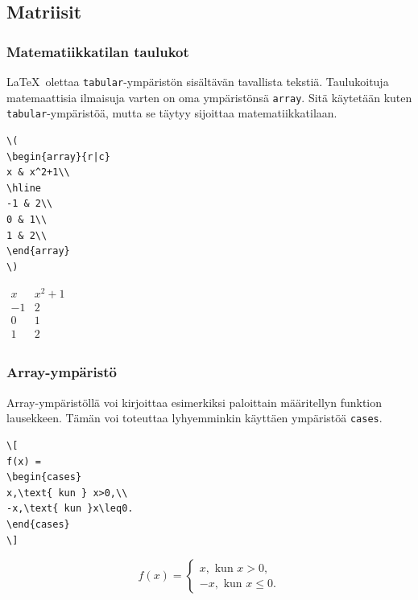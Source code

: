 \documentclass[handout]{beamer}
\theoremstyle{remark}
\newcommand{\vaihto}{\\ \vspace{10pt}}
\begin{document}
\subsection{Matriisit}
\begin{frame}[fragile]
\frametitle{Matematiikkatilan taulukot}
\LaTeX\ olettaa \verb-tabular--ympäristön sisältävän tavallista tekstiä. Taulukoituja matemaattisia ilmaisuja varten on oma ympäristönsä \verb-array-. Sitä käytetään kuten \verb-tabular--ympäristöä, mutta se täytyy sijoittaa matematiikkatilaan.\vaihto

\begin{minipage}{5cm}
\begin{scriptsize}
\begin{Verbatim}[frame=single]
\(
\begin{array}{r|c}
x & x^2+1\\
\hline
-1 & 2\\
0 & 1\\
1 & 2\\
\end{array}
\)
\end{Verbatim}
\end{scriptsize}
\end{minipage}
\begin{minipage}{3cm}
\(
\begin{array}{r|c}
x & x^2+1\\
\hline
-1 & 2\\
0 & 1\\
1 & 2\\
\end{array}
\)
\end{minipage}
\end{frame}
\begin{frame}[fragile]
\frametitle{Array-ympäristö}
Array-ympäristöllä voi kirjoittaa esimerkiksi paloittain määritellyn funktion lausekkeen. Tämän voi toteuttaa lyhyemminkin käyttäen ympäristöä \verb-cases-. 
\begin{Verbatim}[frame=single]
\[
f(x) =
\begin{cases}
x,\text{ kun } x>0,\\
-x,\text{ kun }x\leq0.
\end{cases}
\]
\end{Verbatim}
\begin{framed}
\[
f(x) =
\begin{cases}
x,\text{ kun } x>0,\\
-x,\text{ kun }x\leq0.
\end{cases}
\]
\end{framed}
\end{frame}
\end{document}

